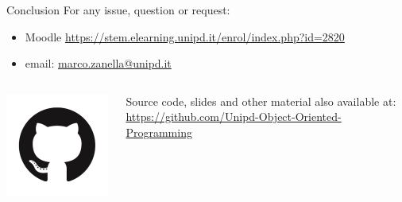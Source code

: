 \documentclass[11pt]{beamer}
\begin{document}
\begin{frame}{Conclusion}
 For any issue, question or request:
 \begin{itemize}
  \item Moodle \url{https://stem.elearning.unipd.it/enrol/index.php?id=2820}
  \item email: \href{mailto:marco.zanella@unipd.it}{marco.zanella@unipd.it}
 \end{itemize}
 
 \begin{columns}
  \begin{column}{0.15\textwidth}
   \includegraphics[width=0.99\textwidth]{assets/logo-github}
  \end{column}
  \begin{column}{0.85\textwidth}
   Source code, slides and other material also available at:
   \url{https://github.com/Unipd-Object-Oriented-Programming}
  \end{column}
 \end{columns}
\end{frame}
\end{document}
